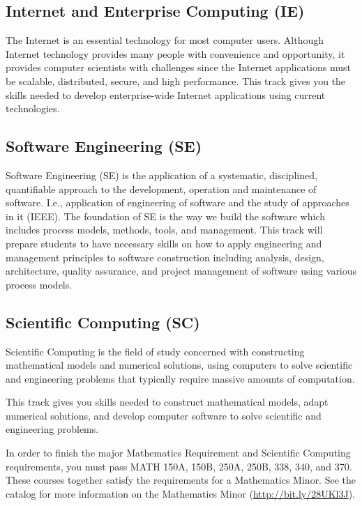 \documentclass{book}
\newcommand{\IeTrackName}{Internet and Enterprise Computing (IE)}
\newcommand{\ScTrackName}{Scientific Computing (SC)}
\newcommand{\SeTrackName}{Software Engineering (SE)}
\begin{document}
\subsection{\IeTrackName}
\IeTrackIndex
The Internet is an essential technology for most computer users. Although Internet technology provides many people with convenience and opportunity, it provides computer scientists with challenges since the Internet applications must be scalable, distributed, secure, and high performance. This track gives you the skills needed to develop enterprise-wide Internet applications using current technologies.

\subsection{\SeTrackName}
\SeTrackIndex
Software Engineering (SE) is the application of a systematic, disciplined, quantifiable approach to the development, operation and maintenance of software. I.e., application of engineering of software and the study of approaches in it (IEEE).  The foundation of SE is the way we build the software which includes process models, methods, tools, and management.  This track will prepare students to have necessary skills on how to apply engineering and management principles to software construction including analysis, design, architecture, quality assurance, and project management of software using various process models.

\subsection{\ScTrackName}
\ScTrackIndex

Scientific Computing is the field of study concerned with constructing mathematical models and numerical solutions, using computers to solve scientific and engineering problems that typically require massive amounts of computation.

This track gives you skills needed to construct mathematical models, adapt numerical solutions, and develop computer software to solve scientific and engineering problems.

In order to finish the major Mathematics Requirement and Scientific Computing requirements, you must pass MATH 150A, 150B, 250A, 250B, 338, 340, and 370. These courses together satisfy the requirements for a Mathematics Minor. See the catalog for more information on the Mathematics Minor (\url{http://bit.ly/28UKl3J}).
\end{document}
